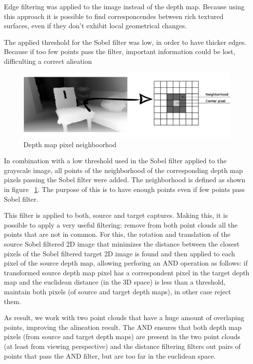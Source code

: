 Edge filtering was applied
to the image instead of the depth map. Because using this approach it is possible to find corresponcendes between rich textured 
surfaces, even if they don't exhibit local geometrical changes.

The applied threshold for the Sobel filter was low, in order to have thicker edges. Because if too few points pass the filter, important information 
could be lost, difficulting a correct alieation


\begin{figure}
\begin{center}
\includegraphics[scale=0.25]{images/vecindarioDepth}
\end{center}
\caption{Depth map pixel neighboorhod}
\label{fig:neighboor}
\end{figure}

In combination with a low threshold used in the Sobel filter applied to the grayscale image, all points of the neighborhood of the corresponding depth map pixels passing the Sobel filter were added. 
The neighborhood is defined as shown in figure ~\ref{fig:neighboor}. The purpose of this is to have enough points even if few points
 pass Sobel filter.

This filter is applied to both, source and target captures. Making this, it is possible to apply a very useful filtering: remove 
from both point clouds all the points that are not in common. For this, the rotation and translation 
of the source Sobel filtered 2D image that minimizes the distance between the closest pixels of the Sobel filtered target 2D image is found and 
then applied to each pixel of the source depth map, 
allowing perforing an AND operation as follows: if transformed source depth map pixel has a correspondent pixel in the target depth map and 
the euclidean distance (in the 3D space) is less than a threshold, maintain both pixels (of source and target depth maps), in other case reject them. 

 As result, we work with two point clouds that have a huge amount of overlaping points, improving the alineation 
result. The AND ensures that both depth map pixels (from source and target depth maps) are present in the two point clouds (at least from viewing 
perspective) and the distance filtering filters out pairs of points that pass the AND filter, but are too far in the euclidean space.

